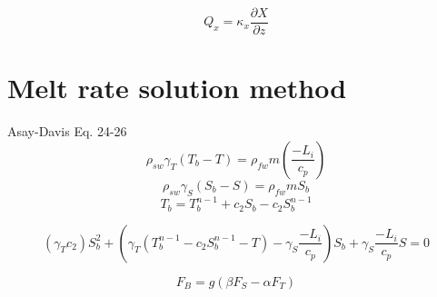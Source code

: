 \documentclass[letterpaper,10pt]{report}
\begin{document}
    \begin{equation}
        Q_x = \kappa_x \frac{\partial X}{\partial z}
    \end{equation}

    \newpage
    
    \section{Melt rate solution method}
	
	Asay-Davis Eq. 24-26
	\begin{equation}
	\rho_{sw} \gamma_T (T_b-T) = \rho_{fw} m(\frac{-L_i}{c_p})
	\end{equation}
	\begin{equation}
	\rho_{sw} \gamma_S (S_b-S) = \rho_{fw} m S_b
	\end{equation}
	\begin{equation}
	T_b = T_b^{n-1}+c_2 S_b - c_2 S_b^{n-1}
	\end{equation}
	
	\begin{equation}
	(\gamma_T c_2) S_b^2 + (\gamma_T(T_b^{n-1}-c_2 S_b^{n-1}-T)-\gamma_S \frac{-L_i}{c_p})S_b + \gamma_S\frac{-L_i}{c_p}S=0
	\end{equation}
	
	
	
	
	
	\begin{equation}
	F_B = g(\beta F_S - \alpha F_T)
	\end{equation}
	
\end{document}
